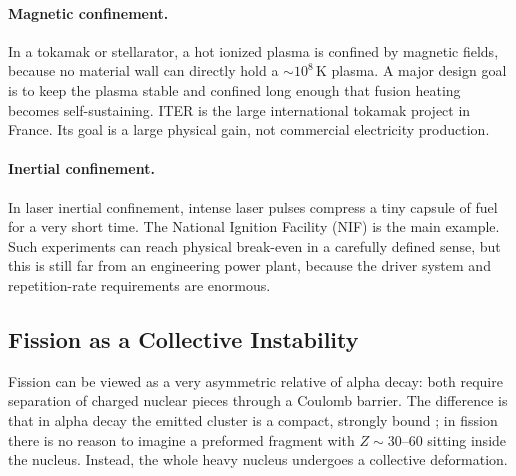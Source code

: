 \paragraph{Magnetic confinement.}
In a tokamak or stellarator, a hot ionized plasma is confined by magnetic fields,
because no material wall can directly hold a $\sim10^8\,\mathrm K$ plasma. A
major design goal is to keep the plasma stable and confined long enough that
fusion heating becomes self-sustaining. ITER is the large international tokamak
project in France. Its goal is a large physical gain, not commercial electricity
production.

\paragraph{Inertial confinement.}
In laser inertial confinement, intense laser pulses compress a tiny capsule of
fuel for a very short time. The National Ignition Facility (NIF) is the main
example. Such experiments can reach physical break-even in a carefully defined
sense, but this is still far from an engineering power plant, because the driver
system and repetition-rate requirements are enormous.


\subsection{Fission as a Collective Instability}
\label{subsec:lec11:fission_liquid_drop}


Fission can be viewed as a very asymmetric relative of alpha decay: both require
separation of charged nuclear pieces through a Coulomb barrier. The difference is
that in alpha decay the emitted cluster is a compact, strongly bound
; in fission there is no reason to imagine a preformed fragment
with $Z\sim30$--$60$ sitting inside the nucleus. Instead, the whole heavy nucleus
undergoes a collective deformation.

